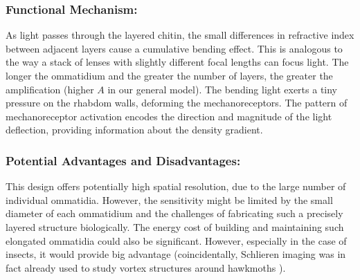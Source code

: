 \documentclass[11pt]{article}
\begin{document}
\subsubsection{Functional Mechanism:}
As light passes through the layered chitin, the small differences in refractive index between adjacent layers cause a cumulative bending effect. This is analogous to the way a stack of lenses with slightly different focal lengths can focus light. The longer the ommatidium and the greater the number of layers, the greater the amplification (higher $A$ in our general model). The bending light exerts a tiny pressure on the rhabdom walls, deforming the mechanoreceptors. The pattern of mechanoreceptor activation encodes the direction and magnitude of the light deflection, providing information about the density gradient.

\subsubsection{Potential Advantages and Disadvantages:}
This design offers potentially high spatial resolution, due to the large number of individual ommatidia. However, the sensitivity might be limited by the small diameter of each ommatidium and the challenges of fabricating such a precisely layered structure biologically. The energy cost of building and maintaining such elongated ommatidia could also be significant. However, especially in the case of insects, it would provide big advantage (coincidentally, Schlieren imaging was in fact already used to study vortex structures around hawkmoths \cite{Liu2018SchlierenHawkmoth}).
\end{document}
